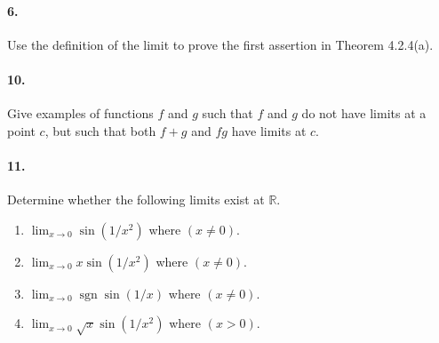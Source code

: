 \documentclass[12pt]{article}
\newcommand\R{\mathbb{R}}
\newcommand{\sgn}{\operatorname{sgn}}
\theoremstyle{remark}
\begin{document}
\paragraph{6.} Use the definition of the limit to prove the first assertion in Theorem 4.2.4(a).

\paragraph{10.} Give examples of functions $f$ and $g$ such that $f$ and $g$ do not have limits at a point $c$, but such that both $f + g$ and $fg$ have limits at $c$.

\paragraph{11.} Determine whether the following limits exist at $\R$.
\begin{enumerate}[label=(\alph*)]
    \item $\lim_{x \to 0} \sin(1/x^2)$ where $(x \neq 0)$.
    \item $\lim_{x \to 0} x \sin(1/x^2)$ where $(x \neq 0)$.
    \item $\lim_{x \to 0} \sgn \sin(1/x)$ where $(x \neq 0)$.
    \item $\lim_{x \to 0} \sqrt{x} \sin(1/x^2)$ where $(x > 0)$.
\end{enumerate}
\end{document}
